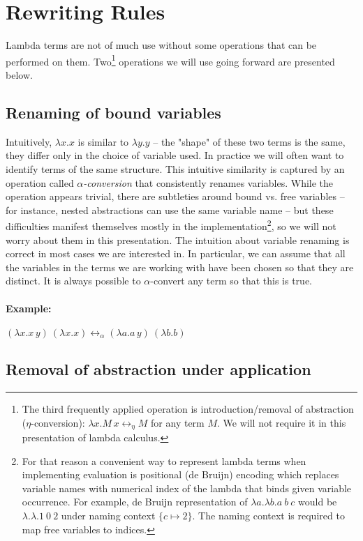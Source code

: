 \documentclass[11pt,twoside,a4paper]{article} %
\begin{document}
\section{Rewriting Rules}

Lambda terms are not of much use without some operations that can be performed
on them. Two\footnote{The third frequently applied operation is introduction/removal 
of abstraction ($\eta$-conversion): $\lambda x.M\,x\longleftrightarrow_\eta M$ for 
any term $M$. We will not require it in this presentation of lambda calculus.} 
operations we will use going forward are presented below.

\subsection{Renaming of bound variables}

Intuitively, $\lambda x.x$ is similar to $\lambda y.y$ -- the "shape" of these
two terms is the same, they differ only in the choice of variable used. In 
practice we will often want to identify terms of the same structure. 
This intuitive similarity is captured by an operation called 
\emph{$\alpha$-conversion} that consistently renames variables. While the
operation appears trivial, there are subtleties around bound vs. free
variables -- for instance, nested abstractions can use the same variable name
-- but these difficulties manifest themselves mostly in the
implementation\footnote{For that reason a convenient way to represent 
lambda terms when implementing evaluation is positional (de Bruijn) encoding
which replaces variable names with numerical index of the lambda that binds given 
variable occurrence. For example, de Bruijn representation of 
$\lambda a.\lambda b.a\ b\ c$  would be $\lambda.\lambda.1\ 0\ 2$ under naming 
context $\{c\mapsto 2\}$.  The naming context is required to map free variables 
to indices.}, so we will not worry about them in this presentation. The intuition 
about variable renaming is correct in most cases we are interested in. In 
particular, we can assume that all the variables in the terms we are working 
with have been chosen so that they are distinct. It is always possible to 
$\alpha$-convert any term so that this is true.
\paragraph{Example:} $(\lambda x.x\,y)\ (\lambda x.x)\longleftrightarrow_\alpha(\lambda
a.a\,y)\ (\lambda b.b)$

\subsection{Removal of abstraction under application}
\end{document}
